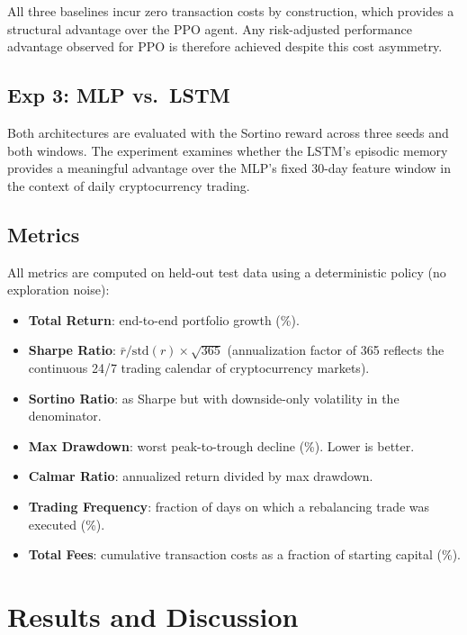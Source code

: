 \documentclass[pdflatex,sn-mathphys-num]{sn-jnl}
\begin{document}
All three baselines incur zero transaction costs by construction, which
provides a structural advantage over the PPO agent. Any risk-adjusted
performance advantage observed for PPO is therefore achieved despite this
cost asymmetry.

\subsection{Exp 3: MLP vs.\ LSTM}

Both architectures are evaluated with the Sortino reward across three seeds
and both windows. The experiment examines whether the LSTM's episodic memory
provides a meaningful advantage over the MLP's fixed 30-day feature window
in the context of daily cryptocurrency trading.

\subsection{Metrics}

All metrics are computed on held-out test data using a deterministic policy
(no exploration noise):

\begin{itemize}[leftmargin=*]
\item \textbf{Total Return}: end-to-end portfolio growth (\%).
\item \textbf{Sharpe Ratio}: $\bar{r} / \mathrm{std}(r) \times \sqrt{365}$ (annualization factor of 365 reflects the continuous 24/7 trading calendar of cryptocurrency markets).
\item \textbf{Sortino Ratio}: as Sharpe but with downside-only volatility in the denominator.
\item \textbf{Max Drawdown}: worst peak-to-trough decline (\%). Lower is better.
\item \textbf{Calmar Ratio}: annualized return divided by max drawdown.
\item \textbf{Trading Frequency}: fraction of days on which a rebalancing trade was executed (\%).
\item \textbf{Total Fees}: cumulative transaction costs as a fraction of starting capital (\%).
\end{itemize}

\section{Results and Discussion}\label{sec:results}
\end{document}

